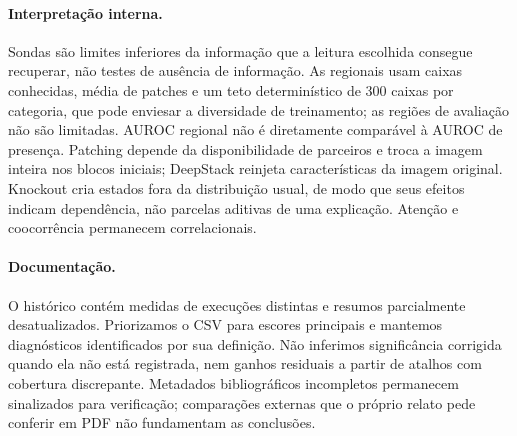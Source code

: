 \paragraph{Interpretação interna.} Sondas são limites inferiores da informação que a leitura escolhida consegue recuperar, não testes de ausência de informação. As regionais usam caixas conhecidas, média de patches e um teto determinístico de 300 caixas por categoria, que pode enviesar a diversidade de treinamento; as regiões de avaliação não são limitadas. AUROC regional não é diretamente comparável à AUROC de presença. Patching depende da disponibilidade de parceiros e troca a imagem inteira nos blocos iniciais; DeepStack reinjeta características da imagem original. Knockout cria estados fora da distribuição usual, de modo que seus efeitos indicam dependência, não parcelas aditivas de uma explicação. Atenção e coocorrência permanecem correlacionais.

\paragraph{Documentação.} O histórico contém medidas de execuções distintas e resumos parcialmente desatualizados. Priorizamos o CSV para escores principais e mantemos diagnósticos identificados por sua definição. Não inferimos significância corrigida quando ela não está registrada, nem ganhos residuais a partir de atalhos com cobertura discrepante. Metadados bibliográficos incompletos permanecem sinalizados para verificação; comparações externas que o próprio relato pede conferir em PDF não fundamentam as conclusões.
